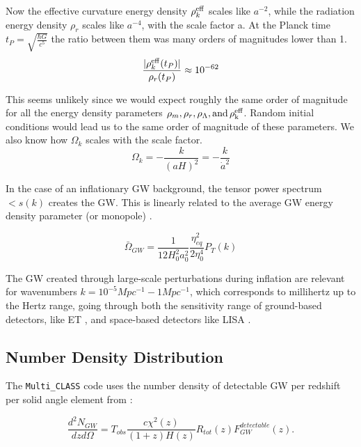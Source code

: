 Now the effective curvature energy density $\rho_{k}^{\rm{eff}}$ scales like $a^{-2}$, while the radiation energy density $\rho_{r}$ scales like $a^{-4}$, with the scale factor a.
At the Planck time $t_P = \sqrt{\frac{\hbar G}{c^5}}$ the ratio between them was many orders of magnitudes lower than 1.
\begin{equation}
    \frac{|\rho_k^{\rm{eff}}(t_P)|}{\rho_r(t_P)} \approx 10^{-62}
\end{equation}

This seems unlikely since we would expect roughly the same order of magnitude for all the energy density parameters $\rho_m, \rho_r, \rho_\Lambda, \rm{ and } \, \rho_k^{eff}$. Random initial conditions would lead us to the same order of magnitude of these parameters.
We also know how $\Omega_k$ scales with the scale factor.
\begin{equation}
    \Omega_k = - \frac{k}{(aH)^2}= -\frac{k}{\dot{a}^2}
\end{equation}

In the case of an inflationary GW background, the tensor power spectrum $<s(k)$ creates the GW. This is linearly related to the average GW energy density parameter (or monopole) \cite{schulze_gw_class_2023}.

\begin{equation}
    \bar{\Omega}_{GW} = \frac{1}{12 H_0^2 a_0^2} \frac{\eta_{eq}^2}{2\eta_0^4} P_T(k)
\end{equation}

The GW created through large-scale perturbations during inflation are relevant for wavenumbers $k=10^{-5} Mpc^{-1} -1 Mpc^{-1}$, which corresponds to millihertz up to the Hertz range, going through both the sensitivity range of ground-based detectors, like ET \cite{alonso_noise_2020}, and space-based detectors like LISA \cite{robson_construction_2019}.


\subsection{Number Density Distribution}

The {\tt Multi\_CLASS} code uses the number density of detectable GW per redshift per solid angle element from \cite{scelfo_gwtimeslss_2018}:

\begin{equation}
    \frac{d^2N_{GW}}{dzd\Omega} = T_{obs}\frac{c\chi^2(z)}{(1+z)H(z)}R_{tot}(z)F_{GW}^{detectable}(z).
\end{equation}

